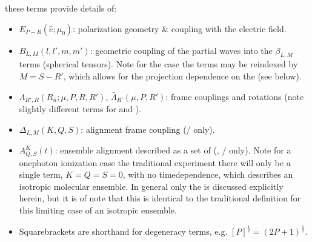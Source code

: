 \documentclass[letterpaper,table,10pt,english]{jupyterBook}
\begin{document}
\sphinxAtStartPar
these terms provide details of:
\begin{itemize}
\item {} 
\sphinxAtStartPar
\({E_{P-R}(\hat{e};\mu_{0})}\): polarization geometry \& coupling with
the electric field.

\item {} 
\sphinxAtStartPar
\(B_{L,M}(l,l',m,m')\): geometric coupling of the partial waves into the \(\beta_{L,M}\) terms (spherical tensors). Note for the {\hyperref[\detokenize{backmatter/glossary:term-AF}]{}} case the terms may be reindexed by \(M=S-R'\), which allows for the projection dependence on the {\hyperref[\detokenize{backmatter/glossary:term-ADMs}]{}} (see below).

\item {} 
\sphinxAtStartPar
\(\Lambda_{R',R}(R_{\hat{n}};\mu,P,R,R')\), \(\bar{\Lambda}_{R'}(\mu,P,R')\): frame couplings and rotations (note slightly different terms for {\hyperref[\detokenize{backmatter/glossary:term-MF}]{}} and {\hyperref[\detokenize{backmatter/glossary:term-AF}]{}}).

\item {} 
\sphinxAtStartPar
\(\Delta_{L,M}(K,Q,S)\): alignment frame coupling ({\hyperref[\detokenize{backmatter/glossary:term-LF}]{}}/{\hyperref[\detokenize{backmatter/glossary:term-AF}]{}} only).

\item {} 
\sphinxAtStartPar
\(A_{Q,S}^{K}(t)\): ensemble alignment described as a set of {\hyperref[\detokenize{backmatter/glossary:term-axis-distribution-moments}]{}} ({\hyperref[\detokenize{backmatter/glossary:term-ADMs}]{}}, {\hyperref[\detokenize{backmatter/glossary:term-LF}]{}}/{\hyperref[\detokenize{backmatter/glossary:term-AF}]{}} only).  Note for a one\sphinxhyphen{}photon ionization case \sphinxhyphen{} the traditional {\hyperref[\detokenize{backmatter/glossary:term-LF}]{}} experiment \sphinxhyphen{} there will only be a single term, \(K=Q=S=0\), with no time\sphinxhyphen{}dependence, which describes an isotropic molecular ensemble. In general only the {\hyperref[\detokenize{backmatter/glossary:term-AF}]{}} is discussed explicitly herein, but it is of note that this is identical to the traditional {\hyperref[\detokenize{backmatter/glossary:term-LF}]{}} definition for this limiting case of an isotropic ensemble.

\item {} 
\sphinxAtStartPar
Square\sphinxhyphen{}brackets are short\sphinxhyphen{}hand for degeneracy terms, e.g. \([P]^{\frac{1}{2}} = (2P+1)^{\frac{1}{2}}\).

\end{itemize}
\end{document}

